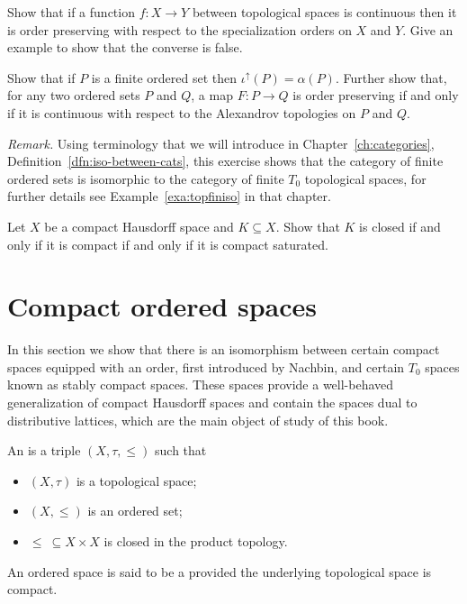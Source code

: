 \begin{exercise}\label{exer:cont-implies-op}
Show that if a function $f\colon X\to Y$ between topological spaces is continuous then it is order preserving with respect to the specialization orders on $X$ and $Y$. Give an example to show that the converse is false.
\end{exercise}

\begin{exercise}\label{exer:TOPfin}
Show that if $P$ is a finite ordered set then $\iota^\uparrow(P)=\alpha(P)$. Further show that, for any two ordered sets $P$ and $Q$, a map $F\colon P\to Q$ is order preserving if and only if it is continuous with respect to the Alexandrov topologies on $P$ and $Q$. 

{\it Remark.} Using terminology that we will introduce in Chapter~\ref{ch:categories}, Definition~\ref{dfn:iso-between-cats}, this exercise shows that
the category of finite ordered sets is isomorphic to the category of finite $T_0$ topological spaces, for further details see Example~\ref{exa:topfiniso} in that chapter.
\end{exercise}

\begin{exercise}\label{exer:compHaus}
Let $X$ be a compact Hausdorff space and $K\subseteq X$. Show that $K$ is closed if and only if it is compact if and only if it is compact saturated.
\end{exercise}

\section{Compact ordered spaces}\label{sec:comp-ord-sp}
In this section we show that there is an isomorphism between certain compact spaces equipped with an order, first introduced by Nachbin, and certain $T_0$ spaces known as stably compact spaces. These spaces provide a well-behaved generalization of compact Hausdorff spaces and contain the spaces dual to distributive lattices, which are the main object of study of this book.

\begin{definition}\label{dfn:comp-ord-sp}
An  is a triple $(X,\tau,\leq)$ such that
\begin{itemize}
\item $(X,\tau)$ is a topological space;
\item $(X,\leq)$ is an ordered set;
\item $\leq\ \subseteq X\times X$ is closed in the product topology.
\end{itemize}
An ordered space is said to be a  provided the underlying topological space is compact.
\end{definition}

